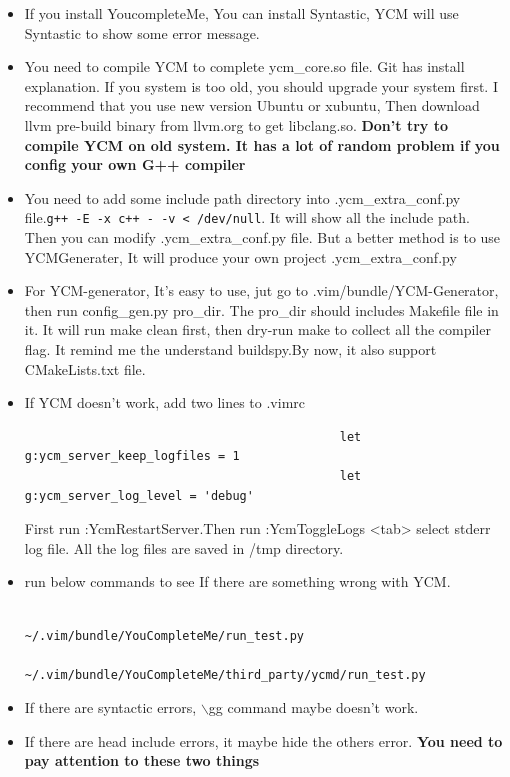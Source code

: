 \documentclass[paper=8.5in:11in, twoside, 12pt, pagesize=pdftex]{book}
\begin{document}
\begin{itemize}
										\item If you install YoucompleteMe, You can install Syntastic, YCM will use Syntastic to show some error message.   
										
										\item You need to compile YCM to complete ycm\_core.so file. Git has install explanation. If you system is too old, you should upgrade your system first. I recommend that you use new version Ubuntu or xubuntu, Then download llvm pre-build binary from llvm.org to get libclang.so. \textbf{Don't try to compile YCM on old system. It has a lot of random problem if you config your own G++ compiler}
										
										
										\item You need to add some include path directory into .ycm\_extra\_conf.py file.\verb=g++ -E -x c++ - -v < /dev/null=. It will show all the include path. Then you can modify .ycm\_extra\_conf.py file. But a better method is to use YCMGenerater, It will produce your own project .ycm\_extra\_conf.py
										
										\item For YCM-generator, It's easy to use, jut go to .vim/bundle/YCM-Generator, then run config\_gen.py pro\_dir. The pro\_dir should includes Makefile file in it.  It will run make clean first, then dry-run make to collect all the compiler flag. It remind me the understand buildspy.By now, it also support CMakeLists.txt file. 
										
										\item If YCM doesn't work, add two lines to .vimrc 
										\begin{verbatim}
											let g:ycm_server_keep_logfiles = 1
											let g:ycm_server_log_level = 'debug'
										\end{verbatim}
										
										First run :YcmRestartServer.Then run :YcmToggleLogs <tab> select stderr log file. All the log files are saved in /tmp directory. 
										
										\item run below commands to see If there are something wrong with YCM. 	
										\begin{verbatim}
											~/.vim/bundle/YouCompleteMe/run_test.py
											~/.vim/bundle/YouCompleteMe/third_party/ycmd/run_test.py
										\end{verbatim}
										\item If there are syntactic errors, $\backslash$gg command maybe doesn't work. 
										
										\item If there are head include errors, it maybe hide the others error. \textbf{You need to pay attention to these two things}
										
									\end{itemize}
									
\end{document}

